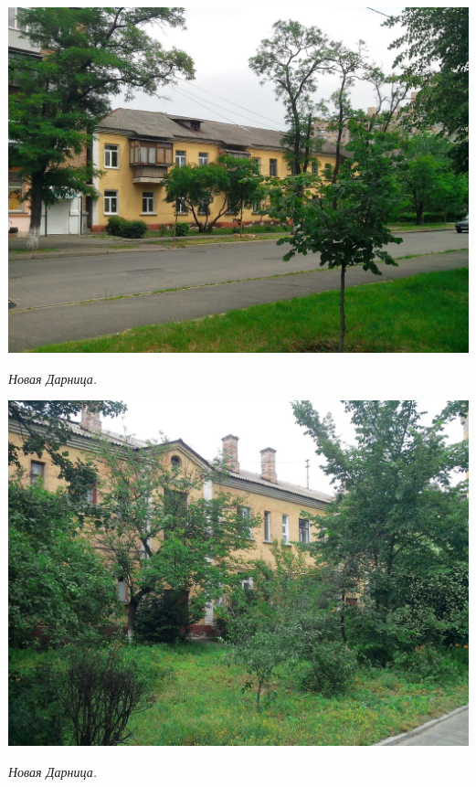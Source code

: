 \begin{center}
\includegraphics[width=\linewidth]{lpix/IMG_20160613_143139.jpg}

\textit{Новая Дарница.}
\end{center}

\newpage
\begin{center}
\includegraphics[width=\linewidth]{lpix/IMG_20160613_143545.jpg}

\textit{Новая Дарница.}
\end{center}


